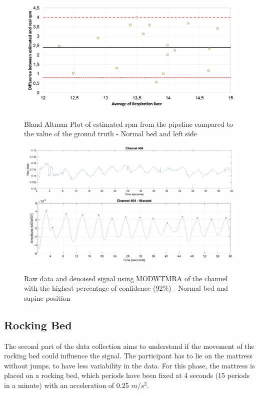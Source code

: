 \begin{figure}[p]
  \centering
  \includegraphics[width=\textwidth]{img/balnd4.png}

  \caption{Bland Altman Plot of estimated rpm from the pipeline compared to the value of the ground truth - Normal bed and left side}
  \label{fig:baln4}
  \vspace{1.5cm}
  \includegraphics[width=\textwidth]{img/404.jpg}
  \includegraphics[width=\textwidth]{img/404_wave.jpg}
\caption{Raw data and denoised signal using MODWTMRA of the channel with the highest percentage of confidence (92\%) - Normal bed and supine position}
  \label{fig:rec4}
\end{figure}

\clearpage
\subsection{Rocking Bed}
The second part of the data collection aims to understand if the movement of the
rocking bed could influence the signal. The participant has to lie on the mattress without jumps, to have less variability in the data. For this phase, the mattress is placed on a rocking bed, which periods have been fixed at 4 seconds (15 periods in a minute) with an acceleration of 0.25 $m/s^2$.


